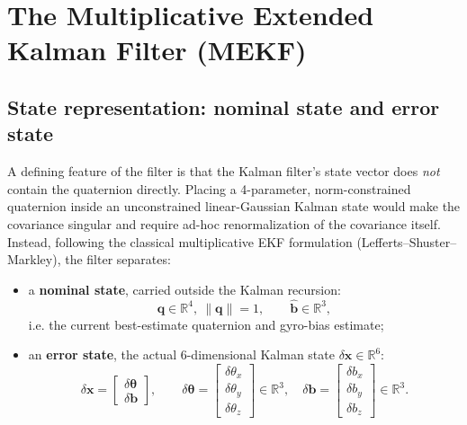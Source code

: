 \documentclass[11pt]{article}
\newcommand{\vect}[1]{\bm{#1}}
\newcommand{\R}{\mathbb{R}}
\newcommand{\quat}{\vect{q}}
\begin{document}
\section{The Multiplicative Extended Kalman Filter (MEKF)}

\subsection{State representation: nominal state and error state}

A defining feature of the filter is that the Kalman filter's state vector does \emph{not} contain the quaternion directly. Placing a 4-parameter, norm-constrained quaternion inside an unconstrained linear-Gaussian Kalman state would make the covariance singular and require ad-hoc renormalization of the covariance itself. Instead, following the classical multiplicative EKF formulation (Lefferts--Shuster--Markley), the filter separates:

\begin{itemize}
    \item a \textbf{nominal state}, carried outside the Kalman recursion:
    \begin{equation}
        \quat \in \R^4,\ \lVert\quat\rVert=1, \qquad \hat{\vect b}\in\R^3,
    \end{equation}
    i.e. the current best-estimate quaternion and gyro-bias estimate;
    \item an \textbf{error state}, the actual $6$-dimensional Kalman state $\delta\vect x \in \R^6$:
    \begin{equation}
        \delta\vect x = \begin{bmatrix}\delta\vect\theta \\ \delta\vect b\end{bmatrix}, \qquad
        \delta\vect\theta = \begin{bmatrix}\delta\theta_x\\\delta\theta_y\\\delta\theta_z\end{bmatrix}\in\R^3,\quad
        \delta\vect b = \begin{bmatrix}\delta b_x\\\delta b_y\\\delta b_z\end{bmatrix}\in\R^3 .
    \end{equation}
\end{itemize}
\end{document}

